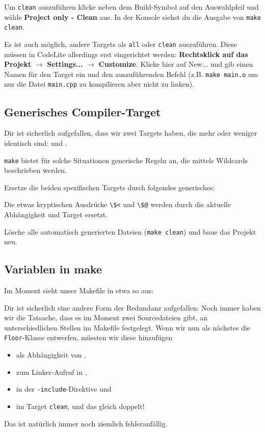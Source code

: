 Um \texttt{clean} auszuführen klicke neben dem Build-Symbol auf den Auswahlpfeil und wähle \textbf{Project only - Clean} aus. In der Konsole siehst du die Ausgabe von \texttt{make clean}.

Es ist auch möglich, andere Targets als \texttt{all} oder \texttt{clean} auszuführen. Diese müssen in CodeLite allerdings erst eingerichtet werden: \textbf{Rechtsklick auf das Projekt} $\to$ \textbf{Settings...} $\to$ \textbf{Customize}. Klicke hier auf New... und gib einen Namen für den Target ein und den auszuführenden Befehl (z.B. \texttt{make main.o} um nur die Datei \texttt{main.cpp} zu kompilieren aber nicht zu linken).

\subsection{Generisches Compiler-Target}

Dir ist sicherlich aufgefallen, dass wir zwei Targets haben, die mehr oder weniger identisch sind:  und .

\texttt{make} bietet für solche Situationen generische Regeln an, die mittels Wildcards beschrieben werden.

Ersetze die beiden spezifischen Targets durch folgendes generisches:

Die etwas kryptischen Ausdrücke \lstinline{\$<} und \lstinline{\$@} werden durch die aktuelle Abhängigkeit und Target ersetzt.

Lösche alle automatisch generierten Dateien (\texttt{make clean}) und baue das Projekt neu.

\subsection{Variablen in make}

Im Moment sieht unser Makefile in etwa so aus:


Dir ist sicherlich eine andere Form der Redundanz aufgefallen:
Noch immer haben wir die Tatsache, dass es im Moment zwei Sourcedateien gibt, an unterschiedlichen Stellen im Makefile festgelegt.
Wenn wir nun als nächstes die \lstinline{Floor}-Klasse entwerfen, müssten wir diese hinzufügen
\begin{itemize}
    \item als Abhängigkeit von ,
    \item zum Linker-Aufruf in ,
    \item in der \lstinline{-include}-Direktive und
    \item im Target \lstinline{clean}, und das gleich doppelt!
\end{itemize}
Das ist natürlich immer noch ziemlich fehleranfällig.

